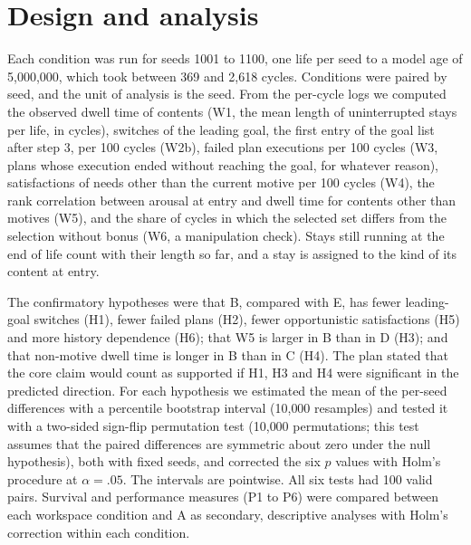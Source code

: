 \documentclass[11pt,a4paper]{article}
\begin{document}
\section{Design and analysis}

Each condition was run for seeds 1001 to 1100, one life per seed to a model age of 5{,}000{,}000, which took between 369 and 2{,}618 cycles. Conditions were paired by seed, and the unit of analysis is the seed. From the per-cycle logs we computed the observed dwell time of contents (W1, the mean length of uninterrupted stays per life, in cycles), switches of the leading goal, the first entry of the goal list after step 3, per 100 cycles (W2b), failed plan executions per 100 cycles (W3, plans whose execution ended without reaching the goal, for whatever reason), satisfactions of needs other than the current motive per 100 cycles (W4), the rank correlation between arousal at entry and dwell time for contents other than motives (W5), and the share of cycles in which the selected set differs from the selection without bonus (W6, a manipulation check). Stays still running at the end of life count with their length so far, and a stay is assigned to the kind of its content at entry.

The confirmatory hypotheses were that B, compared with E, has fewer leading-goal switches (H1), fewer failed plans (H2), fewer opportunistic satisfactions (H5) and more history dependence (H6); that W5 is larger in B than in D (H3); and that non-motive dwell time is longer in B than in C (H4). The plan stated that the core claim would count as supported if H1, H3 and H4 were significant in the predicted direction. For each hypothesis we estimated the mean of the per-seed differences with a percentile bootstrap interval (10{,}000 resamples) and tested it with a two-sided sign-flip permutation test (10{,}000 permutations; this test assumes that the paired differences are symmetric about zero under the null hypothesis), both with fixed seeds, and corrected the six $p$ values with Holm's procedure at $\alpha = .05$. The intervals are pointwise. All six tests had 100 valid pairs. Survival and performance measures (P1 to P6) were compared between each workspace condition and A as secondary, descriptive analyses with Holm's correction within each condition.
\end{document}
